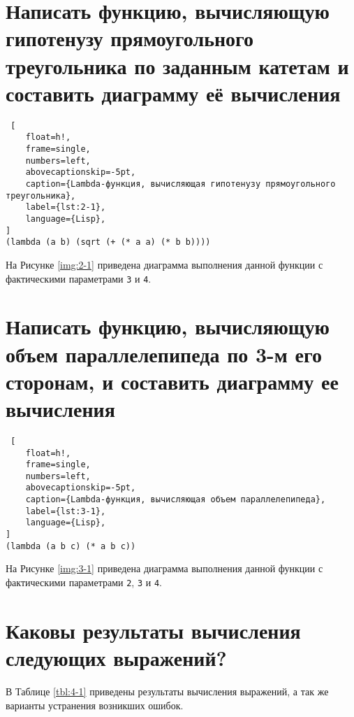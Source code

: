 
\clearpage

\section{Написать функцию, вычисляющую гипотенузу прямоугольного
треугольника по заданным катетам и составить диаграмму её вычисления}

\begin{lstlisting} [
	float=h!,
	frame=single,
	numbers=left,
	abovecaptionskip=-5pt,
	caption={Lambda-функция, вычисляющая гипотенузу прямоугольного треугольника},
	label={lst:2-1},
	language={Lisp},
]
(lambda (a b) (sqrt (+ (* a a) (* b b))))
\end{lstlisting}

На Рисунке \ref{img:2-1} приведена диаграмма выполнения данной функции с фактическими параметрами \texttt{3} и \texttt{4}.


\clearpage

\section{Написать функцию, вычисляющую объем параллелепипеда по 3-м его сторонам, и составить диаграмму ее вычисления}

\begin{lstlisting} [
	float=h!,
	frame=single,
	numbers=left,
	abovecaptionskip=-5pt,
	caption={Lambda-функция, вычисляющая объем параллелепипеда},
	label={lst:3-1},
	language={Lisp},
]
(lambda (a b c) (* a b c))
\end{lstlisting}

На Рисунке \ref{img:3-1} приведена диаграмма выполнения данной функции с фактическими параметрами \texttt{2}, \texttt{3} и \texttt{4}.


\section{Каковы результаты вычисления следующих выражений?}

В Таблице \ref{tbl:4-1} приведены результаты вычисления выражений, а так же варианты устранения возникших ошибок.

